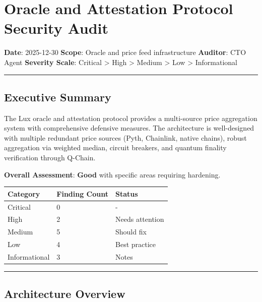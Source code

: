 \documentclass[
]{article}
\author{}
\date{}
\newcounter{none} %
\begin{document}
\section{Oracle and Attestation Protocol Security
Audit}\label{oracle-and-attestation-protocol-security-audit}

\textbf{Date}: 2025-12-30 \textbf{Scope}: Oracle and price feed
infrastructure \textbf{Auditor}: CTO Agent \textbf{Severity Scale}:
Critical \textgreater{} High \textgreater{} Medium \textgreater{} Low
\textgreater{} Informational

\begin{center}\rule{0.5\linewidth}{0.5pt}\end{center}

\subsection{Executive Summary}\label{executive-summary}

The Lux oracle and attestation protocol provides a multi-source price
aggregation system with comprehensive defensive measures. The
architecture is well-designed with multiple redundant price sources
(Pyth, Chainlink, native chains), robust aggregation via weighted
median, circuit breakers, and quantum finality verification through
Q-Chain.

\textbf{Overall Assessment}: \textbf{Good} with specific areas requiring
hardening.

{\def\LTcaptype{none} %
\begin{longtable}[]{@{}lll@{}}
\toprule\noalign{}
Category & Finding Count & Status \\
\midrule\noalign{}
\endhead
\bottomrule\noalign{}
\endlastfoot
Critical & 0 & - \\
High & 2 & Needs attention \\
Medium & 5 & Should fix \\
Low & 4 & Best practice \\
Informational & 3 & Notes \\
\end{longtable}
}

\begin{center}\rule{0.5\linewidth}{0.5pt}\end{center}

\subsection{Architecture Overview}\label{architecture-overview}
\end{document}
